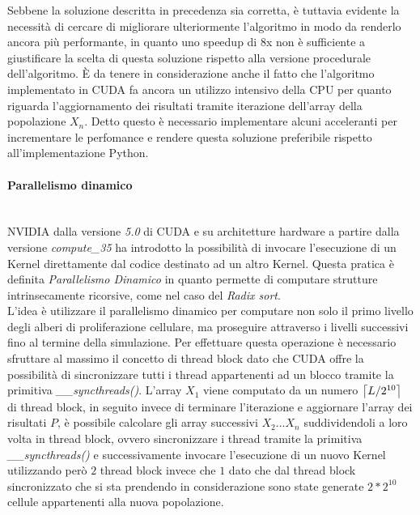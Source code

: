 Sebbene la soluzione descritta in precedenza sia corretta, è tuttavia
evidente la necessità di cercare di migliorare ulteriormente
l'algoritmo in modo da renderlo ancora più performante, in quanto uno
speedup di 8x non è sufficiente a giustificare la scelta di questa soluzione
rispetto alla versione procedurale dell'algoritmo.
È da tenere in considerazione anche il fatto che l'algoritmo implementato
in CUDA fa ancora un utilizzo intensivo della CPU per quanto riguarda
l'aggiornamento dei risultati tramite iterazione dell'array della
popolazione $X_{n}$.
Detto questo è necessario implementare alcuni acceleranti per
incrementare le perfomance e rendere questa soluzione preferibile rispetto
all'implementazione Python.

\paragraph{Parallelismo dinamico}\mbox{}
\\
NVIDIA dalla versione \textit{5.0} di CUDA e su architetture hardware a partire
dalla versione \textit{compute\_35} ha introdotto la possibilità di invocare
l'esecuzione di un Kernel direttamente dal codice destinato ad un altro Kernel.
Questa pratica è definita
\textit{Parallelismo Dinamico}\cite{jones2012introduction} in quanto permette
di computare strutture intrinsecamente ricorsive, come nel caso del
\textit{Radix sort}\cite{merrill2011high}.
\\
L'idea è utilizzare il parallelismo dinamico per computare non solo il primo
livello degli alberi di proliferazione cellulare, ma proseguire attraverso i
livelli successivi fino al termine della simulazione.
Per effettuare questa operazione è necessario sfruttare al massimo il concetto di
thread block dato che CUDA offre la possibilità di sincronizzare
tutti i thread appartenenti ad un blocco tramite la primitiva
\textit{\_\_syncthreads()}\cite{jones2012introduction}.
L'array $X_{1}$ viene computato da un numero $\ceil*{L/2^{10}}$ di thread block,
in seguito invece di terminare l'iterazione e aggiornare l'array dei risultati
$P$, è possibile calcolare gli array successivi $X_{2}...X_{n}$ suddividendoli
a loro volta in thread block, ovvero sincronizzare i thread tramite la
primitiva \textit{\_\_syncthreads()} e successivamente invocare l'esecuzione di
un nuovo Kernel utilizzando però $2$ thread block invece che $1$ dato che dal
thread block sincronizzato che si sta prendendo in considerazione sono state
generate $2 * 2^{10}$ cellule appartenenti alla nuova popolazione.

